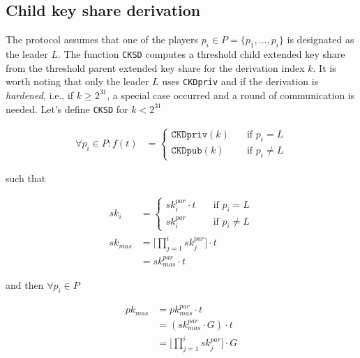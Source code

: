 \subsection{Child key share derivation}

The protocol assumes that one of the players $p_i \in P = \{p_1, \dots, p_{i}\}$ is designated as the leader
$L$. The function \texttt{CKSD} computes a threshold child extended key share
from the threshold parent extended key share for the derivation index $k$. It is
worth noting that only the leader $L$ uses \texttt{CKDpriv} and if the derivation
is \textit{hardened}, i.e., if $k \geq 2^{31}$, a special case occurred and a
round of communication is needed. Let's define \texttt{CKSD} for $k < 2^{31}$

\begin{equation}
\begin{split}
  \forall p_i \in P : f(t) &=
  \begin{cases}
    \texttt{CKDpriv}(k) & \quad \text{if } p_i = L\\%
    \texttt{CKDpub}(k) & \quad \text{if } p_i \neq L
  \end{cases}
\end{split}
\end{equation}

such that

\begin{equation}
\begin{split}
  sk_{i} &=
  \begin{cases}
    sk_{i}^{par} \cdot t & \quad \text{if } p_i = L\\%
    sk_{i}^{par} & \quad \text{if } p_i \neq L
  \end{cases}\\
  sk_{mas} &= \Bigg[ \prod_{j=1}^{i} sk_{j}^{par} \Bigg] \cdot t \\
       &= sk_{mas}^{par} \cdot t
\end{split}
\end{equation}

and then $\forall p_i \in P$

\begin{equation}
\begin{split}
  pk_{mas} &= pk_{mas}^{par} \cdot t \\
       &= (sk_{mas}^{par} \cdot G) \cdot t \\
       &= \Bigg[ \prod_{j=1}^{i} sk_{j}^{par} \Bigg] \cdot G
\end{split}
\end{equation}

